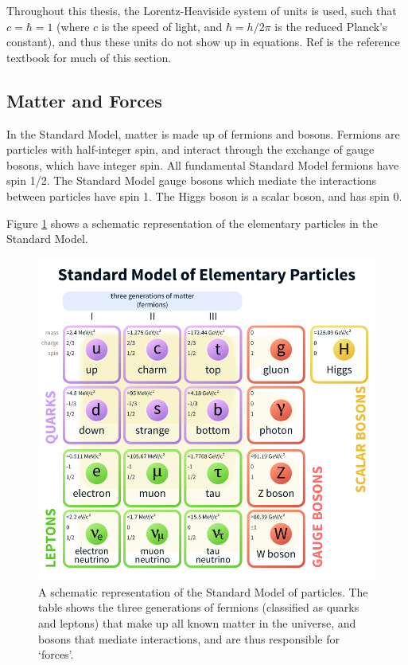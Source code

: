 \documentclass[12pt,a4paper,openright,twoside]{report}
\begin{document}
Throughout this thesis, the Lorentz-Heaviside system of units is used, such that $c=\hbar=1$ (where $c$ is the speed of light, and $\hbar=h/2\pi$ is the reduced Planck's constant), and thus these units do not show up in equations. Ref \cite{griff} is the reference textbook for much of this section.

\subsection{Matter and Forces}

In the Standard Model, matter is made up of fermions and bosons. Fermions are particles with half-integer spin, and interact through the exchange of gauge bosons, which have integer spin. All fundamental Standard Model fermions have spin 1/2. The Standard Model gauge bosons which mediate the interactions between particles have spin 1. The Higgs boson is a scalar boson, and has spin 0.

Figure \ref{fig:SM} shows a schematic representation of the elementary particles in the Standard Model.

\begin{figure}[H]
\centering
\includegraphics[width=0.8\linewidth]{standard_model.png}
\caption{A schematic representation of the Standard Model\cite{SM} of particles. The table shows the three generations of fermions (classified as quarks and leptons) that make up all known matter in the universe, and bosons that mediate interactions, and are thus responsible for `forces'.}
\label{fig:SM}
\end{figure}
\end{document}
